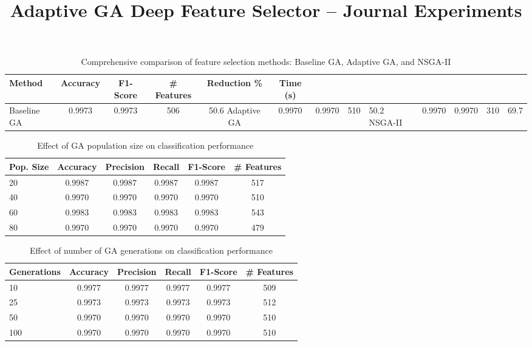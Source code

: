 \documentclass{article}
\begin{document}
\title{Adaptive GA Deep Feature Selector -- Journal Experiments}
\maketitle

\begin{table}[htbp]
\centering
\caption{Comprehensive comparison of feature selection methods: Baseline GA, Adaptive GA, and NSGA-II}
\label{tab:table10}
\begin{tabular}{lccccc}
\toprule
Method & Accuracy & F1-Score & \# Features & Reduction \% & Time (s) \\
\midrule
Baseline GA & 0.9973 & 0.9973 & 506 & 50.6%
Adaptive GA & 0.9970 & 0.9970 & 510 & 50.2%
NSGA-II & 0.9970 & 0.9970 & 310 & 69.7%
\bottomrule
\end{tabular}
\end{table}

\begin{table}[htbp]
\centering
\caption{Effect of GA population size on classification performance}
\label{tab:table11}
\begin{tabular}{lccccc}
\toprule
Pop. Size & Accuracy & Precision & Recall & F1-Score & \# Features \\
\midrule
20 & 0.9987 & 0.9987 & 0.9987 & 0.9987 & 517 \\
40 & 0.9970 & 0.9970 & 0.9970 & 0.9970 & 510 \\
60 & 0.9983 & 0.9983 & 0.9983 & 0.9983 & 543 \\
80 & 0.9970 & 0.9970 & 0.9970 & 0.9970 & 479 \\
\bottomrule
\end{tabular}
\end{table}

\begin{table}[htbp]
\centering
\caption{Effect of number of GA generations on classification performance}
\label{tab:table12}
\begin{tabular}{lccccc}
\toprule
Generations & Accuracy & Precision & Recall & F1-Score & \# Features \\
\midrule
10 & 0.9977 & 0.9977 & 0.9977 & 0.9977 & 509 \\
25 & 0.9973 & 0.9973 & 0.9973 & 0.9973 & 512 \\
50 & 0.9970 & 0.9970 & 0.9970 & 0.9970 & 510 \\
100 & 0.9970 & 0.9970 & 0.9970 & 0.9970 & 510 \\
\bottomrule
\end{tabular}
\end{table}
\end{document}
